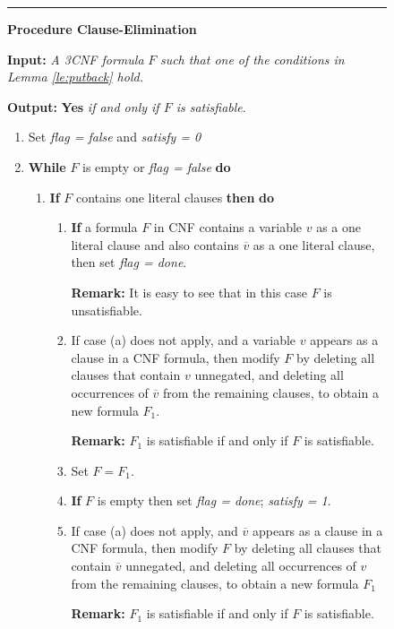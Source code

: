 \smallspacing
{\small
\begin{figure}[tbp]
\rule{10cm}{0.01in}

\noindent
{\bf Procedure Clause-Elimination} 

\noindent
{\bf Input:} {\it A 3CNF formula } $F$ {\em such that one of the conditions
in Lemma \ref{le:putback} hold.}

\noindent
{\bf Output:} {\bf Yes} {\em if and only if $F$ is satisfiable}.
\begin{enumerate}
\item
Set  {\em flag = false} and {\em satisfy = 0}
\item

{\bf While} $F$ is empty or {\em flag = false} {\bf do}

\begin{enumerate}
\item
{\bf If} $F$ contains one literal clauses {\bf then} {\bf do}
\begin{enumerate}
\item
{\bf If} a formula $F$ in {\sf CNF} 
contains a variable $v$ as a one literal clause and
also contains $\overline{v}$ as a one literal clause, 
then  set {\em flag = done}.

\noindent
{\bf Remark:} It is easy to see that in this case $F$ is unsatisfiable. 

\item 
If case (a) does not apply, and a variable $v$ appears as a clause in a 
{\sf CNF}
formula, then modify $F$ by deleting all clauses that contain $v$
unnegated, and deleting all occurrences of $\overline{v}$ from the remaining
clauses, to obtain a new formula $F_1$.

\noindent
{\bf Remark:} $F_1$ is satisfiable if and only if  $F$ is satisfiable. 

\item
Set $F = F_1$.

\item
{\bf If} $F$ is empty then set {\em flag = done}; {\em satisfy = 1}.

\item
If case (a) does not apply, and  $\overline{v}$ appears as a clause 
in a {\sf CNF}
formula, then modify $F$ by deleting all clauses that contain 
$\overline{v}$
unnegated, and deleting all occurrences of $v$ from the remaining
clauses, to obtain a new formula $F_1$ 

\noindent
{\bf Remark:} $F_1$ is satisfiable if and only if $F$ is satisfiable.


\end{enumerate}
\end{enumerate}
\end{enumerate}
\end{figure}}

